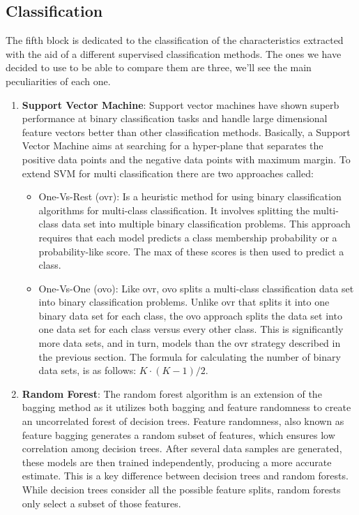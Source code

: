 \documentclass[conference]{IEEEtran}
\begin{document}
\subsection{Classification\label{K_Means_pseudo}}
\noindent
The fifth block is dedicated to the classification of the characteristics extracted with the aid of a different supervised classification methods. The ones we have decided to use to be able to compare them are three, we'll see the main peculiarities of each one.
\begin{enumerate}
    \item\textbf{Support Vector Machine}: Support vector machines have shown superb performance at binary classification tasks and handle large dimensional feature vectors better than other classification methods. Basically, a Support Vector Machine aims at searching for a hyper-plane that separates the positive data points and the negative data points with maximum margin. To extend SVM for multi classification there are two approaches called:
    \begin{itemize}
        \item One-Vs-Rest (ovr): Is a heuristic method for using binary classification algorithms for multi-class classification. It involves splitting the multi-class data set into multiple binary classification problems. This approach requires that each model predicts a class membership probability or a probability-like score. The max of these scores is then used to predict a class.\cite{murphy2012machine}
        \item One-Vs-One (ovo): Like ovr, ovo splits a multi-class classification data set into binary classification problems. Unlike ovr that splits it into one binary data set for each class, the ovo approach splits the data set into one data set for each class versus every other class. This is significantly more data sets, and in turn, models than the ovr strategy described in the previous section. The formula for calculating the number of binary data sets, is as follows: ${K \cdot (K-1)}/2$.\cite{murphy2012machine}
    \end{itemize}
    \item\textbf{Random Forest}: The random forest algorithm is an extension of the bagging method as it utilizes both bagging and feature randomness to create an uncorrelated forest of decision trees. Feature randomness, also known as feature bagging generates a random subset of features, which ensures low correlation among decision trees. After several data samples are generated, these models are then trained independently,  producing a more accurate estimate. This is a key difference between decision trees and random forests. While decision trees consider all the possible feature splits, random forests only select a subset of those features.

\end{enumerate}
\end{document}
